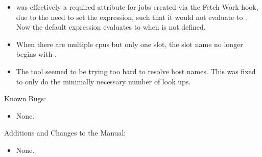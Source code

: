 \begin{itemize}

\item {} was effectively a required attribute for
  jobs created via the Fetch Work hook,
  due to the need to set the 
  expression, such that it would not evaluate to .
  Now the default  expression
  evaluates to  when  is not defined.

\item When there are multiple cpus but only one slot, the slot name no
longer begins with .

\item The tool  seemed to be trying too hard to resolve
host names. This was fixed to only do the minimally necessary 
number of look ups.

\end{itemize}

\noindent Known Bugs:

\begin{itemize}

\item None.

\end{itemize}

\noindent Additions and Changes to the Manual:

\begin{itemize}

\item None.

\end{itemize}

